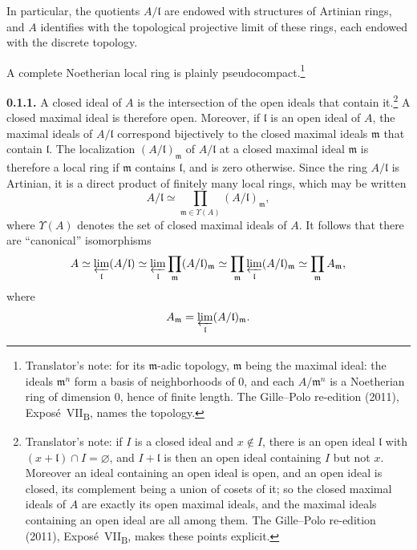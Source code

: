 In particular, the quotients \(A/\mathfrak l\) are endowed with
structures of Artinian rings, and
\(A\) identifies with the topological projective limit of these rings,
each endowed with the discrete topology.

A complete Noetherian local ring is plainly pseudocompact.\footnote{Translator's note: for its
\(\mathfrak m\)-adic topology, \(\mathfrak m\) being the maximal ideal: the ideals \(\mathfrak m^n\) form a
basis of neighborhoods of \(0\), and each \(A/\mathfrak m^n\) is a Noetherian ring of dimension \(0\), hence
of finite length. The Gille--Polo re-edition (2011), Expos\'e~VII\textsubscript{B}, names the topology.}

\medskip
\noindent\textbf{0.1.1.}
\label{sga3:VIIB:0.1.1}
A closed ideal of \(A\) is the intersection of the open ideals that
contain it.\footnote{Translator's note: if \(I\) is a closed ideal and \(x\notin I\), there is an open ideal
\(\mathfrak l\) with \((x+\mathfrak l)\cap I=\varnothing\), and \(I+\mathfrak l\) is then an open ideal
containing \(I\) but not \(x\). Moreover an ideal containing an open ideal is open, and an open ideal is
closed, its complement being a union of cosets of it; so the closed maximal ideals of \(A\) are exactly its
open maximal ideals, and the maximal ideals containing an open ideal are all among them. The Gille--Polo
re-edition (2011), Expos\'e~VII\textsubscript{B}, makes these points explicit.} A closed maximal ideal is
therefore open. Moreover, if
\(\mathfrak l\) is an open ideal of \(A\), the maximal ideals of
\(A/\mathfrak l\) correspond bijectively to the closed maximal ideals
\(\mathfrak m\) that contain \(\mathfrak l\). The localization
\((A/\mathfrak l)_{\mathfrak m}\) of \(A/\mathfrak l\) at a closed maximal
ideal \(\mathfrak m\) is therefore a local ring if \(\mathfrak m\) contains
\(\mathfrak l\), and is zero otherwise. Since the ring \(A/\mathfrak l\) is
Artinian, it is a direct product of finitely many local rings, which may be
written
\[
  A/\mathfrak l
  \simeq
  \prod_{\mathfrak m\in\Upsilon(A)}
    (A/\mathfrak l)_{\mathfrak m},
\]
where \(\Upsilon(A)\) denotes the set of closed maximal ideals of \(A\).
It follows that there are ``canonical'' isomorphisms
\[
  A
  \simeq \varprojlim_{\mathfrak l}(A/\mathfrak l)
  \simeq \varprojlim_{\mathfrak l}
    \prod_{\mathfrak m}(A/\mathfrak l)_{\mathfrak m}
  \simeq \prod_{\mathfrak m}
    \varprojlim_{\mathfrak l}(A/\mathfrak l)_{\mathfrak m}
  \simeq \prod_{\mathfrak m}A_{\mathfrak m},
\]
where
\[
  A_{\mathfrak m}
  =
  \varprojlim_{\mathfrak l}(A/\mathfrak l)_{\mathfrak m}.
\]
